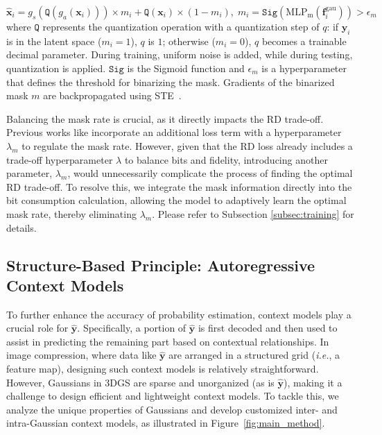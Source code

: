 \documentclass{article} %
\newcommand{\ie}{\textit{i.e.}}
\begin{document}
\vspace{-15pt}
\begin{equation}
    \hat{\bm{x}}_i = g_s(\texttt{Q}(g_a(\bm{x}_i)))\times m_i + \texttt{Q}(\bm{x}_i)\times (1-m_i), \; m_i=\texttt{Sig}(\text{MLP}_\text{m}(\bm{f}^{\text{gau}}_i)) > \epsilon_m
\end{equation}
where $\texttt{Q}$ represents the quantization operation with a quantization step of $q$: if $\bm{y}_i$ is in the latent space ($m_i=1$), $q$ is $1$; otherwise ($m_i=0$), $q$ becomes a trainable decimal parameter. During training, uniform noise is added, while during testing, quantization is applied. $\texttt{Sig}$ is the Sigmoid function and $\epsilon_m$ is a hyperparameter that defines the threshold for binarizing the mask. Gradients of the binarized mask $m$ are backpropagated using STE~\citep{STE,Lee}.

Balancing the mask rate is crucial, as it directly impacts the RD trade-off. Previous works like \citet{Lee} incorporate an additional loss term with a hyperparameter $\lambda_m$ to regulate the mask rate. However, given that the RD loss already includes a trade-off hyperparameter $\lambda$ to balance bits and fidelity, introducing another parameter, $\lambda_m$, would unnecessarily complicate the process of finding the optimal RD trade-off. To resolve this, we integrate the mask information directly into the bit consumption calculation, allowing the model to adaptively learn the optimal mask rate, thereby eliminating $\lambda_m$. Please refer to Subsection \ref{subsec:training} for details.

\subsection{Structure-Based Principle: Autoregressive Context Models}

To further enhance the accuracy of probability estimation, context models play a crucial role for $\hat{\bm{y}}$. Specifically, a portion of $\hat{\bm{y}}$ is first decoded and then used to assist in predicting the remaining part based on contextual relationships. In image compression, where data like $\hat{\bm{y}}$ are arranged in a structured grid (\ie, a feature map), designing such context models is relatively straightforward. However, Gaussians in 3DGS are sparse and unorganized (as is $\hat{\bm{y}}$), making it a challenge to design efficient and lightweight context models. To tackle this, we analyze the unique properties of Gaussians and develop customized inter- and intra-Gaussian context models, as illustrated in Figure~\ref{fig:main_method}.
\end{document}
